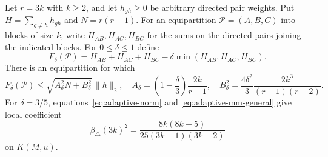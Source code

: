 \begin{lemma}
\label{lem:adaptive-mm}
Let $r=3k$ with $k\ge2$, and let $h_{gh}\ge0$ be arbitrary directed pair
weights.  Put $H=\sum_{g\ne h}h_{gh}$ and $N=r(r-1)$.
For an equipartition $\mathcal P=(A,B,C)$ into blocks of size $k$, write
$H_{AB},H_{AC},H_{BC}$ for the sums on the directed pairs joining the
indicated blocks.  For $0\le\delta\le1$ define
\[
 F_\delta(\mathcal P)=H_{AB}+H_{AC}+H_{BC}
            -\delta\min(H_{AB},H_{AC},H_{BC}).
\]
There is an equipartition for which
\begin{equation}\label{eq:adaptive-mm-general}
 F_\delta(\mathcal P)
 \le \sqrt{A_\delta^2N+B_\delta^2}\,\|h\|_2,
 \quad
 A_\delta=\left(1-\frac\delta3\right)\frac{2k}{r-1},
 \quad B_\delta^2=\frac{4\delta^2}{3}
             \frac{2k^3}{(r-1)(r-2)}.
\end{equation}
For $\delta=3/5$, equations~\eqref{eq:adaptive-norm} and
\eqref{eq:adaptive-mm-general} give local coefficient
\begin{equation}\label{eq:adaptive-triangle-coefficient}
 \beta_{\triangle}(3k)^2
 =\frac{8k(8k-5)}{25(3k-1)(3k-2)}
\end{equation}
on $K(M,u)$.
\end{lemma}
